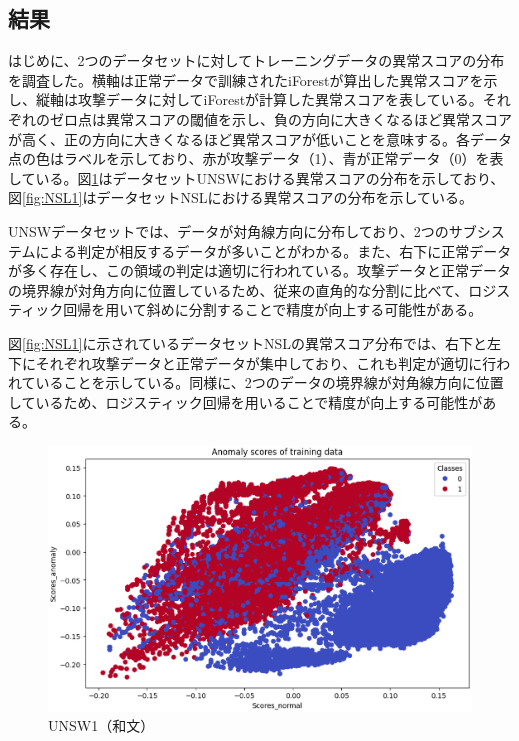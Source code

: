 \documentclass{css}
\begin{document}
\subsection{結果}

はじめに、2つのデータセットに対してトレーニングデータの異常スコアの分布を調査した。横軸は正常データで訓練されたiForestが算出した異常スコアを示し、縦軸は攻撃データに対してiForestが計算した異常スコアを表している。それぞれのゼロ点は異常スコアの閾値を示し、負の方向に大きくなるほど異常スコアが高く、正の方向に大きくなるほど異常スコアが低いことを意味する。各データ点の色はラベルを示しており、赤が攻撃データ（1）、青が正常データ（0）を表している。図\ref{fig:UNSW1}はデータセットUNSWにおける異常スコアの分布を示しており、図\ref{fig:NSL1}はデータセットNSLにおける異常スコアの分布を示している。

UNSWデータセットでは、データが対角線方向に分布しており、2つのサブシステムによる判定が相反するデータが多いことがわかる。また、右下に正常データが多く存在し、この領域の判定は適切に行われている。攻撃データと正常データの境界線が対角方向に位置しているため、従来の直角的な分割に比べて、ロジスティック回帰を用いて斜めに分割することで精度が向上する可能性がある。

図\ref{fig:NSL1}に示されているデータセットNSLの異常スコア分布では、右下と左下にそれぞれ攻撃データと正常データが集中しており、これも判定が適切に行われていることを示している。同様に、2つのデータの境界線が対角線方向に位置しているため、ロジスティック回帰を用いることで精度が向上する可能性がある。

\begin{figure}[tb]
    \centering
    \includegraphics[width=\linewidth]{pictures/eps/UNSW1.eps}
    \caption{UNSW1（和文）}
    \label{fig:UNSW1}
\end{figure}
\end{document}
